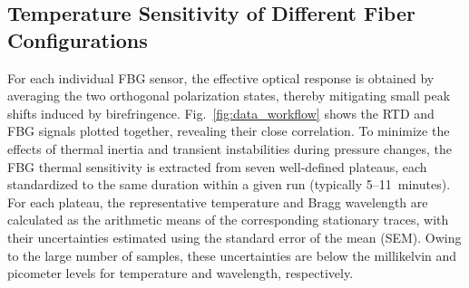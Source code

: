 \documentclass[preprint,11pt]{elsarticle}
\begin{document}
 \subsection{Temperature Sensitivity of Different Fiber Configurations}
 \label{subsec:temp_sensitivity}




For each individual FBG sensor, the effective optical response is obtained by averaging the two orthogonal polarization states, thereby mitigating small peak shifts induced by birefringence. Fig.~\ref{fig:data_workflow} shows the RTD and FBG signals plotted together, revealing their close correlation. To minimize the effects of thermal inertia and transient instabilities during pressure changes, the FBG thermal sensitivity is extracted from seven well-defined plateaus, each standardized to the same duration within a given run (typically 5--11~minutes). For each plateau, the representative temperature and Bragg wavelength are calculated as the arithmetic means of the corresponding stationary traces, with their uncertainties estimated using the standard error of the mean (SEM). Owing to the large number of samples, these uncertainties are below the millikelvin and picometer levels for temperature and wavelength, respectively.
\end{document}
